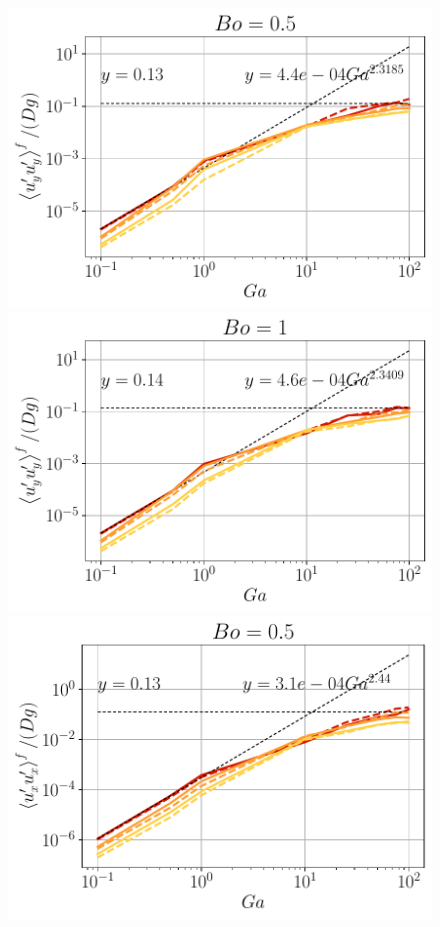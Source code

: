 \begin{figure}[h!]
    \centering
    \includegraphics[height=0.20\textheight]{image/N_10/UU/UU_fyy_Bo_0_5.pdf}
    \includegraphics[height=0.20\textheight]{image/N_10/UU/UU_fyy_Bo_1.pdf}
    \includegraphics[height=0.20\textheight]{image/N_10/UU/UU_fxx_Bo_0_5.pdf}

\end{figure}

